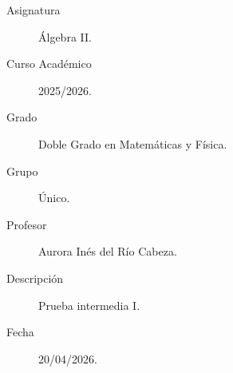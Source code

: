 \documentclass[12pt]{article}
\begin{document}

    
    

    \begin{description}
        \item[Asignatura] Álgebra II.
        \item[Curso Académico] 2025/2026.
        \item[Grado] Doble Grado en Matemáticas y Física.
        \item[Grupo] Único.
        \item[Profesor] Aurora Inés del Río Cabeza.
        \item[Descripción] Prueba intermedia I.
        \item[Fecha] 20/04/2026.
    \end{description}
    \newpage


    
\end{document}
